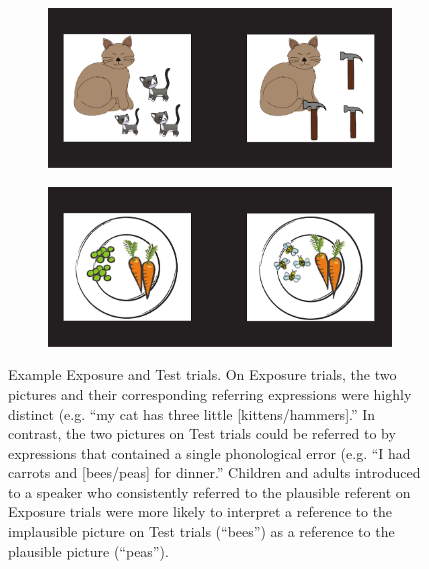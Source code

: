 \documentclass[man,floatsintext]{apa6}
\begin{document}
\begin{figure}[tb]
     \centering
        \begin{subfigure}[b]{.4 \textwidth}
            \caption{\label{fig:exposure}}
            \includegraphics[width=\textwidth]{figures/exposure.pdf}
        \end{subfigure}\quad
        \vspace{12 pt}
        \begin{subfigure}[b]{.4 \textwidth}
           \caption{\label{fig:test}}
           \includegraphics[width=\textwidth]{figures/testing.pdf}
        \end{subfigure}
    \caption{Example Exposure and Test trials. On Exposure trials, the two pictures and their corresponding referring expressions were highly distinct (e.g. ``my cat has three little [kittens/hammers].'' In contrast, the two pictures on Test trials could be referred to by expressions that contained a single phonological error (e.g. ``I had carrots and [bees/peas] for dinner.'' Children and adults introduced to a speaker who consistently referred to the plausible referent on Exposure trials were more likely to interpret a reference to the implausible picture on Test trials (``bees'') as a reference to the plausible picture (``peas'').}
   \label{fig:stimuli}
\end{figure}
\end{document}
